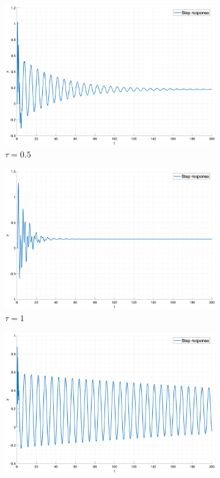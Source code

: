 \begin{figure}[ht!]
\begin{subfigure}{0.5\textwidth}
        \includegraphics[width=\textwidth]{media/plots/task7_step_response_closed_3.png}
        \caption{$\tau = 0.5$}
    \end{subfigure}
    \begin{subfigure}{0.5\textwidth}
        \centering
        \includegraphics[width=\textwidth]{media/plots/task7_step_response_closed_4.png}
        \caption{$\tau = 1$}
    \end{subfigure}
    \begin{subfigure}{0.5\textwidth}
        \centering
        \includegraphics[width=\textwidth]{media/plots/task7_step_response_closed_5.png}

\end{subfigure}
\end{figure}

